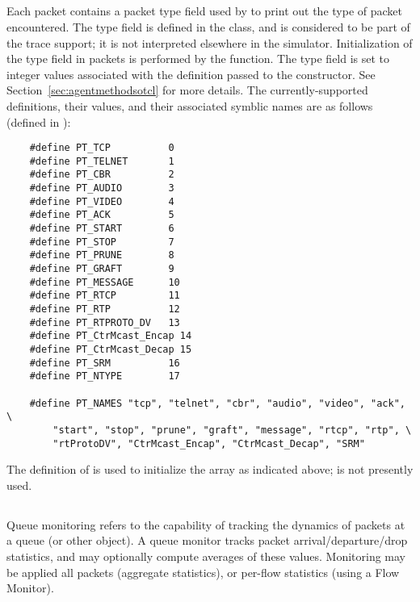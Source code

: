 \subsection{}

Each packet contains a packet type field used by 
to print out the type of packet encountered.
The type field is defined in the  class, and is considered
to be part of the trace support; it is not interpreted
elsewhere in the simulator.
Initialization of the type field in packets is performed by the
 function.
The type field is set to integer values associated with the
definition passed to the  constructor.
See Section~\ref{sec:agentmethodsotcl} for more details.
The currently-supported definitions, their values, and their
associated symblic names are as follows
(defined in ):
\begin{small}
\begin{verbatim}
	#define PT_TCP          0
	#define PT_TELNET       1
	#define PT_CBR          2
	#define PT_AUDIO        3
	#define PT_VIDEO        4
	#define PT_ACK          5
	#define PT_START        6
	#define PT_STOP         7
	#define PT_PRUNE        8
	#define PT_GRAFT        9
	#define PT_MESSAGE      10
	#define PT_RTCP         11
	#define PT_RTP          12
	#define PT_RTPROTO_DV   13
	#define PT_CtrMcast_Encap 14
	#define PT_CtrMcast_Decap 15
	#define PT_SRM          16
	#define PT_NTYPE        17

	#define PT_NAMES "tcp", "telnet", "cbr", "audio", "video", "ack", \
		"start", "stop", "prune", "graft", "message", "rtcp", "rtp", \
		"rtProtoDV", "CtrMcast_Encap", "CtrMcast_Decap", "SRM"

\end{verbatim}
\end{small}
The definition of  is used to initialize the
 array as indicated above;
\code{PT_NTYPE} is not presently used.

\subsection{}

Queue monitoring refers to the capability of tracking the
dynamics of packets at a queue (or other object).
A queue monitor tracks packet arrival/departure/drop statistics,
and may optionally compute averages of these values.
Monitoring may be applied all packets (aggregate statistics), or
per-flow statistics (using a Flow Monitor).

